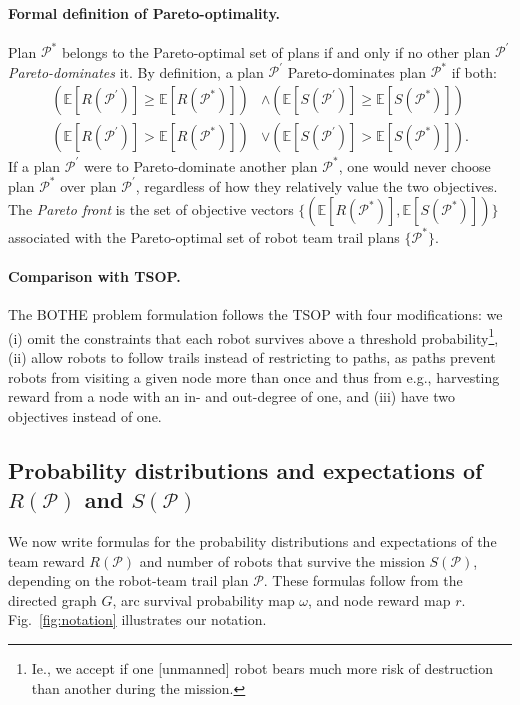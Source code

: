 \documentclass[11pt, oneside]{article}
\begin{document}
\paragraph{Formal definition of Pareto-optimality.}
Plan $\mathcal{P}^*$ belongs to the Pareto-optimal set of plans if and only if no other plan $\mathcal{P}^\prime$ \emph{Pareto-dominates} it. By definition, a plan $\mathcal{P}^\prime$ Pareto-dominates plan $\mathcal{P}^*$ if both:
\begin{align}
	\left (\mathbb{E}[R(\mathcal{P}^\prime)] \geq \mathbb{E}[R(\mathcal{P}^*)]  \right) & \wedge \left( \mathbb{E}[S(\mathcal{P}^\prime)] \geq \mathbb{E}[S(\mathcal{P}^*)] \right) \\
	\left( \mathbb{E}[R(\mathcal{P}^\prime)] > \mathbb{E}[R(\mathcal{P}^*)] \right) & \vee \left( \mathbb{E}[S(\mathcal{P}^\prime)] > \mathbb{E}[S(\mathcal{P}^*)] \right).
\end{align}
If a plan $\mathcal{P}^\prime$ were to Pareto-dominate another plan $\mathcal{P}^*$, one would never choose plan $\mathcal{P}^*$ over plan $\mathcal{P}^\prime$, regardless of how they relatively value the two objectives. The \emph{Pareto front} is the set of objective vectors $\{(\mathbb{E}[R(\mathcal{P}^*)], \mathbb{E}[S(\mathcal{P}^*)])\}$ associated with the Pareto-optimal set of robot team trail plans $\{\mathcal{P}^*\}$.  

\paragraph{Comparison with TSOP.}
The BOTHE problem formulation follows the TSOP \cite{jorgensen2018team} with four modifications: we 
(i) omit the constraints that each robot survives above a threshold probability\footnote{Ie., we accept if one [unmanned] robot bears much more risk of destruction than another during the mission.},
(ii) allow robots to follow trails instead of restricting to paths, as paths prevent robots from visiting a given node more than once and thus from e.g., harvesting reward from a node with an in- and out-degree of one, 
and
(iii) have two objectives instead of one.

\subsection{Probability distributions and expectations of $R(\mathcal{P})$ and $S(\mathcal{P})$}
We now write formulas for the probability distributions and expectations of the team reward $R(\mathcal{P})$ and number of robots that survive the mission $S(\mathcal{P})$, depending on the robot-team trail plan $\mathcal{P}$. 
These formulas follow from the directed graph $G$, arc survival probability map $\omega$, and node reward map $r$. Fig.~\ref{fig:notation} illustrates our notation.
\end{document}
